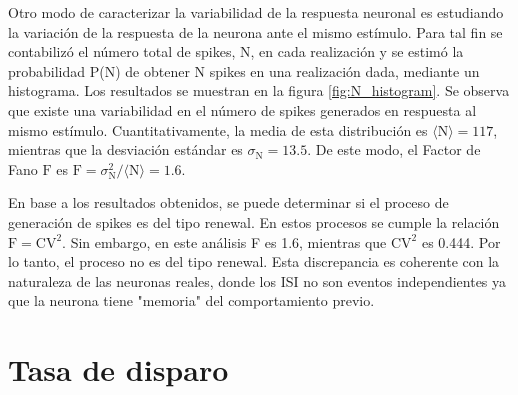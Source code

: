 \documentclass[aps,prb,twocolumn,superscriptaddress,floatfix,longbibliography]{revtex4-2}
\begin{document}
Otro modo de caracterizar la variabilidad de la respuesta neuronal es estudiando la variación de la respuesta de la neurona ante el mismo estímulo. Para tal fin se contabilizó el número total de spikes, N, en cada realización y se estimó la probabilidad P(N) de obtener N spikes en una realización dada, mediante un histograma. Los resultados se muestran en la figura \ref{fig:N_histogram}. Se observa que existe una variabilidad en el número de spikes generados en respuesta al mismo estímulo. Cuantitativamente, la media de esta distribución es $\langle \mathrm{N} \rangle = 117$, mientras que la desviación estándar es $\sigma_{\mathrm{N}} = 13.5$. De este modo, el Factor de Fano $\mathrm{F}$ es $\mathrm{F} =  \sigma_\mathrm{N}^2/\langle \mathrm{N} \rangle = 1.6$.

En base a los resultados obtenidos, se puede determinar si el proceso de generación de spikes es del tipo renewal. En estos procesos se cumple la relación $\mathrm{F} = \mathrm{CV}^2$. Sin embargo, en este análisis F es 1.6, mientras que $\mathrm{CV}^2$ es 0.444. Por lo tanto, el proceso no es del tipo renewal. Esta discrepancia es coherente con la naturaleza de las neuronas reales, donde los ISI no son eventos independientes ya que la neurona tiene "memoria" del comportamiento previo.

\section{Tasa de disparo}
\end{document}
